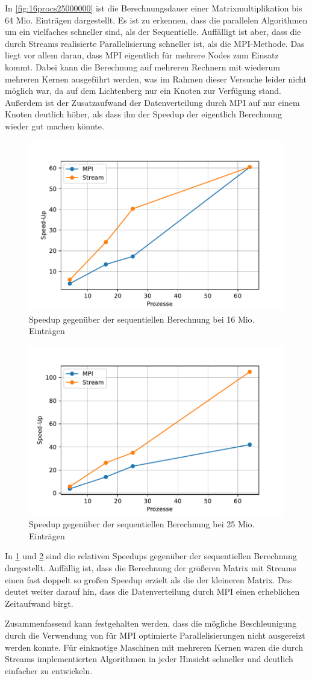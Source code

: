 \documentclass[
ngerman,
ruledheaders=section,
class=report,
thesis={type=Dokumentation},
ignore-missing-data=true,
accentcolor=9c,
custommargins=false,
marginpar=false,
parskip=half-,
fontsize=11pt,
]{tudapub}
\begin{document}
	In \ref{fig:16procs25000000} ist die Berechnungsdauer einer Matrixmultiplikation bis 64 Mio. Einträgen dargestellt. Es ist zu erkennen, dass die parallelen Algorithmen um ein vielfaches schneller sind, als der Sequentielle. Auffälligt ist aber, dass die durch Streams realisierte Parallelisierung schneller ist, als die MPI-Methode. Das liegt vor allem daran, dass MPI eigentlich für mehrere Nodes zum Einsatz kommt. Dabei kann die Berechnung auf mehreren Rechnern mit wiederum mehreren Kernen ausgeführt werden, was im Rahmen dieser Versuche leider nicht möglich war, da auf dem Lichtenberg nur ein Knoten zur Verfügung stand. Außerdem ist der Zusatzaufwand der Datenverteilung durch MPI auf nur einem Knoten deutlich höher, als dass ihn der Speedup der eigentlich Berechnung wieder gut machen könnte.
		
	\begin{figure}[H]
		\centering
		\includegraphics[width=0.6\linewidth]{content/speedup_16000000}
		\caption{Speedup gegenüber der sequentiellen Berechnung bei 16 Mio. Einträgen}
		\label{fig:speedup16000000}
	\end{figure}
	\begin{figure}[H]
		\centering
		\includegraphics[width=0.6\linewidth]{content/speedup_25000000}
		\caption{Speedup gegenüber der sequentiellen Berechnung bei 25 Mio. Einträgen}
		\label{fig:speedup25000000}
	\end{figure}
	
	In \ref{fig:speedup16000000} und \ref{fig:speedup25000000} sind die relativen Speedups gegenüber der sequentiellen Berechnung dargestellt. Auffällig ist, dass die Berechnung der größeren Matrix mit Streams einen fast doppelt so großen Speedup erzielt als die der kleineren Matrix. Das deutet weiter darauf hin, dass die Datenverteilung durch MPI einen erheblichen Zeitaufwand birgt.
	
	Zusammenfassend kann festgehalten werden, dass die mögliche Beschleunigung durch die Verwendung von für MPI optimierte Parallelisierungen nicht ausgereizt werden konnte. Für einknotige Maschinen mit mehreren Kernen waren die durch Streams implementierten Algorithmen in jeder Hinsicht schneller und deutlich einfacher zu entwickeln.
	
\end{document}
